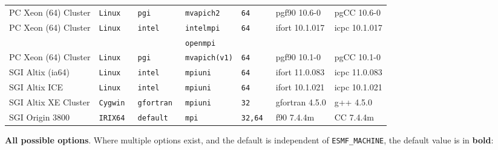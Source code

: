 \begin{tabular}{lllllll}
PC Xeon (64) Cluster  &\tt Linux  &\tt pgi          &\tt mvapich2   &\tt 64              & pgf90 \footnotesize 10.6-0         & pgCC \footnotesize 10.6-0       \\ %
PC Xeon (64) Cluster  &\tt Linux  &\tt intel        &\tt intelmpi   &\tt 64              & ifort \footnotesize 10.1.017       & icpc \footnotesize 10.1.017     \\ %
                      &           &                 &\tt openmpi    &                    &                                    &                                 \\
PC Xeon (64) Cluster  &\tt Linux  &\tt pgi          &\tt mvapich(v1)&\tt 64              & pgf90 \footnotesize 10.1-0         & pgCC \footnotesize 10.1-0       \\ %
SGI Altix (ia64)      &\tt Linux  &\tt intel        &\tt mpiuni     &\tt 64              & ifort \footnotesize 11.0.083       & icpc \footnotesize 11.0.083     \\ %
SGI Altix ICE         &\tt Linux  &\tt intel        &\tt mpiuni     &\tt 64              & ifort \footnotesize 10.1.021       & icpc \footnotesize 10.1.021     \\ %
SGI Altix XE Cluster  &\tt Cygwin &\tt gfortran     &\tt mpiuni     &\tt 32              & gfortran \footnotesize 4.5.0       & g++  \footnotesize 4.5.0        \\ %
SGI Origin 3800       &\tt IRIX64 &\tt default      &\tt mpi        &\tt 32,64           & f90 \footnotesize 7.4.4m           & CC \footnotesize 7.4.4m            %
\end{tabular}

\vspace{1ex}

{\bf All possible options}. Where multiple options exist, and the default is independent
of {\tt ESMF\_MACHINE}, the default value is in {\bf bold}:

\vspace{1ex}


